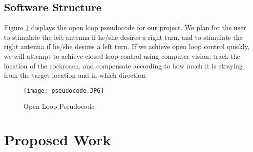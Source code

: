 \documentclass{article}
\begin{document}
\subsection{Software Structure}
 Figure \ref{fig:pseudocode} displays the open loop pseudocode for our project. We plan for the user to stimulate the left antenna if he/she desires a right turn, and to stimulate the right antenna if he/she desires a left turn. If we achieve open loop control quickly, we will attempt to achieve closed loop control using computer vision, track the location of the cockroach, and compensate according to how much it is straying from the target location and in which direction.

\begin{figure}[ht!]
\centering
\texttt{[image: pseudocode.JPG]}
\caption{Open Loop Pseudocode}
\label{fig:pseudocode}
\end{figure}

\section{Proposed Work}
\end{document}
